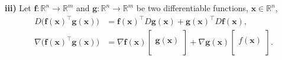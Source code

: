 \documentclass[12pt,thmsa]{article}
\begin{document}
\noindent
\textbf{iii)} Let \( \boldsymbol{f}: \mathbb{R}^{n} \rightarrow \mathbb{R}^{m}\) and \( \boldsymbol{g}: \mathbb{R}^{n} \rightarrow \mathbb{R}^{m}\) be two differentiable functions, \(\boldsymbol{x} \in \mathbb{R}^{n}\),
\[ 
\begin{aligned}
	D \bigg (\boldsymbol{f}(\boldsymbol{x})^{\top} \boldsymbol{g}(\boldsymbol{x}) \bigg )
	& =\boldsymbol{f}(\boldsymbol{x})^{\top} D \boldsymbol{g}(\boldsymbol{x})+\boldsymbol{g}(\boldsymbol{x})^{\top} D \boldsymbol{f}(\boldsymbol{x}), \\
	\nabla \bigg (\boldsymbol{f}(\boldsymbol{x})^{\top} \boldsymbol{g}(\boldsymbol{x}) \bigg )
	& = \nabla \boldsymbol{f}(\boldsymbol{x}) \left [\begin{array}{c}\\  \boldsymbol{g}(\boldsymbol{x}) \\  \\ \end{array} \right ] 
   		+ \nabla\boldsymbol{g} (\boldsymbol{x}) \left[\begin{array}{c}\\  f(\boldsymbol{x}) \\  \\ \end{array} \right] . \\
\end{aligned}
\]
\end{document}
